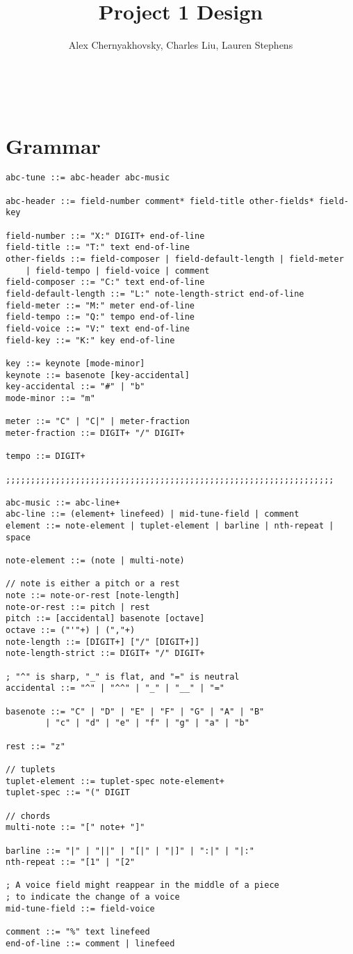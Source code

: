 \documentclass[12pt]{article}
\newcommand{\student}{Alex Chernyakhovsky, Charles Liu, Lauren Stephens}
\newcommand{\pset}{Project 1 Design}
\begin{document}
\title{\pset}
\author{\student}
\date{}
\maketitle
\thispagestyle{fancy}
\
\section{Grammar}
\begin{verbatim}
abc-tune ::= abc-header abc-music

abc-header ::= field-number comment* field-title other-fields* field-key
        
field-number ::= "X:" DIGIT+ end-of-line
field-title ::= "T:" text end-of-line
other-fields ::= field-composer | field-default-length | field-meter 
	| field-tempo | field-voice | comment
field-composer ::= "C:" text end-of-line
field-default-length ::= "L:" note-length-strict end-of-line
field-meter ::= "M:" meter end-of-line
field-tempo ::= "Q:" tempo end-of-line
field-voice ::= "V:" text end-of-line
field-key ::= "K:" key end-of-line

key ::= keynote [mode-minor]
keynote ::= basenote [key-accidental]
key-accidental ::= "#" | "b"
mode-minor ::= "m"

meter ::= "C" | "C|" | meter-fraction
meter-fraction ::= DIGIT+ "/" DIGIT+ 

tempo ::= DIGIT+ 

;;;;;;;;;;;;;;;;;;;;;;;;;;;;;;;;;;;;;;;;;;;;;;;;;;;;;;;;;;;;;;;;;;

abc-music ::= abc-line+
abc-line ::= (element+ linefeed) | mid-tune-field | comment
element ::= note-element | tuplet-element | barline | nth-repeat | space 

note-element ::= (note | multi-note)

// note is either a pitch or a rest
note ::= note-or-rest [note-length]
note-or-rest ::= pitch | rest
pitch ::= [accidental] basenote [octave]
octave ::= ("'"+) | (","+)
note-length ::= [DIGIT+] ["/" [DIGIT+]]
note-length-strict ::= DIGIT+ "/" DIGIT+

; "^" is sharp, "_" is flat, and "=" is neutral
accidental ::= "^" | "^^" | "_" | "__" | "="

basenote ::= "C" | "D" | "E" | "F" | "G" | "A" | "B"
        | "c" | "d" | "e" | "f" | "g" | "a" | "b"

rest ::= "z"

// tuplets
tuplet-element ::= tuplet-spec note-element+
tuplet-spec ::= "(" DIGIT 

// chords
multi-note ::= "[" note+ "]"

barline ::= "|" | "||" | "[|" | "|]" | ":|" | "|:"
nth-repeat ::= "[1" | "[2"

; A voice field might reappear in the middle of a piece
; to indicate the change of a voice
mid-tune-field ::= field-voice

comment ::= "%" text linefeed
end-of-line ::= comment | linefeed
\end{verbatim}
\end{document}
